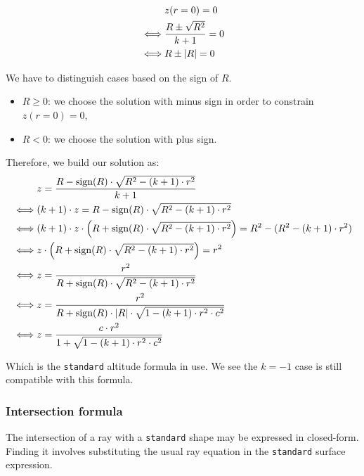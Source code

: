 \begin{equation} \begin{split}
& z(r=0) = 0 \\
\iff & \frac{R \pm \sqrt{R^2}}{k+1} = 0 \\
\iff & R \pm \abs{R} = 0
\end{split} \end{equation}

We have to distinguish cases based on the sign of $R$.
\begin{itemize}
\item $R \geq 0$: we choose the solution with minus sign in order to constrain
                  $z(r=0)=0$,
\item $R < 0$: we choose the solution with plus sign.
\end{itemize}

Therefore, we build our solution as:
\begin{equation} \begin{split}
& z = \frac{R - \textrm{sign}(R) \cdot \sqrt{R^2 - (k+1) \cdot r^2}}{k+1} \\
\iff & (k+1) \cdot z = R - \textrm{sign}(R) \cdot \sqrt{R^2 - (k+1) \cdot r^2}\\
\iff & (k+1) \cdot z \cdot \left( R + \textrm{sign}(R) \cdot
       \sqrt{R^2 - (k+1) \cdot r^2} \right) = R^2 - (R^2 - (k+1) \cdot r^2) \\
\iff & z \cdot \left( R + \textrm{sign}(R) \cdot
       \sqrt{R^2 - (k+1) \cdot r^2} \right) = r^2 \\
\iff & z = \frac{r^2}{R + \textrm{sign}(R) \cdot \sqrt{R^2 - (k+1) \cdot r^2}}\\
\iff & z = \frac{r^2}{R + \textrm{sign}(R) \cdot \abs{R} \cdot
                      \sqrt{1 - (k+1) \cdot r^2 \cdot c^2}} \\
\iff & z = \frac{c \cdot r^2}{1 + \sqrt{1 - (k+1) \cdot r^2 \cdot c^2}}
\end{split} \end{equation}

Which is the \lstinline{standard} altitude formula in use. We see the $k=-1$
case is still compatible with this formula.

\subsubsection{Intersection formula}
The intersection of a ray with a \lstinline{standard} shape may be expressed
in closed-form. Finding it involves substituting the usual ray equation in
the \lstinline{standard} surface expression.

